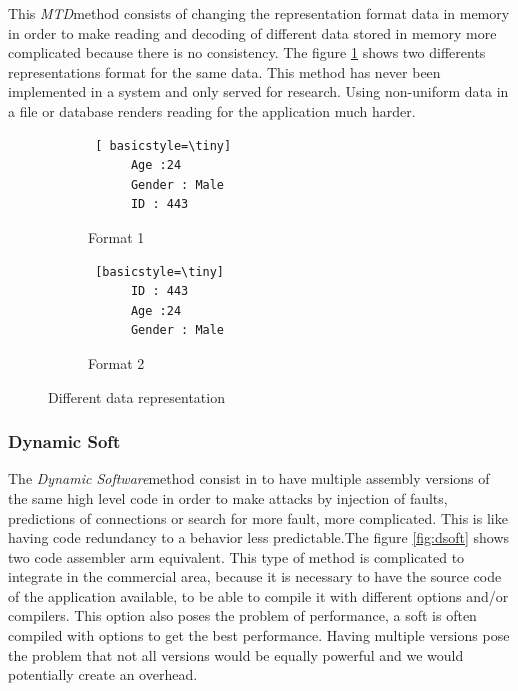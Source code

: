 This \emph{MTD}method consists of changing the representation format
data in memory in order to make reading and decoding of different data
stored in memory more complicated because there is no consistency. The
figure \ref{fig:ddata} shows two differents representations format for
the same data. \newline
This method has never been implemented in a system and only served for
research. Using non-uniform data in a file or database renders reading
for the application much harder.


\begin{figure}[h]
  \centering
  \begin{subfigure}{0.49\textwidth} %
  \centering
    \begin{lstlisting} [ basicstyle=\tiny]
      Age :24
      Gender : Male
      ID : 443
    \end{lstlisting}
    \caption{Format 1}
  \end{subfigure}
  \hfill
  \begin{subfigure}{0.49\textwidth} %
    \centering
    \begin{lstlisting} [basicstyle=\tiny] 
      ID : 443
      Age :24
      Gender : Male
    \end{lstlisting}
    \caption{Format 2}
  \end{subfigure}
  \caption{Different  data representation}
  \label{fig:ddata}
\end{figure}


\subsubsection{ Dynamic Soft}

The \emph{Dynamic Software}method consist in to have multiple assembly
versions of the same high level code in order to make attacks by
injection of faults, predictions of connections or search for more
fault, more complicated. This is like having code redundancy to a
 behavior less predictable.The figure \ref{fig:dsoft} shows two
code assembler arm equivalent. \newline
This type of method is complicated to integrate in the commercial
area, because it is necessary  to have the source code of the
application available, to be able to compile it with different
options and/or compilers. This option also poses the problem of
performance, a soft is often compiled with options to get
the best performance. Having multiple versions pose the problem that
not all versions would be equally powerful and we would potentially create an
overhead.


